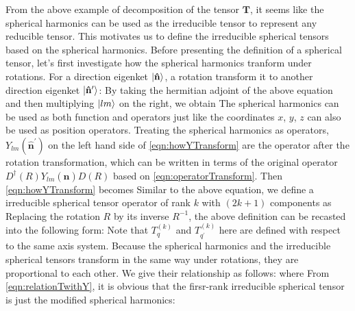 From  the above example of decomposition of the tensor $\mathbf{T}$, it seems like the spherical harmonics can be 
used as the irreducible tensor to represent any reducible tensor. This motivates us to define the irreducible spherical
tensors based on the spherical harmonics. Before presenting the definition of a spherical tensor, let's first investigate
how the spherical harmonics tranform under rotations. For a direction eigenket $|   \mathbf{\hat{n}}   \rangle$, a rotation 
transform it to another direction eigenket $|   \mathbf{\hat{n }^{\prime} }   \rangle$:
By taking the hermitian adjoint of the above equation and then multiplying $| l m \rangle$ on the right, we obtain
The spherical harmonics can be used as both function and operators just like the coordinates $x$, $y$, $z$ can also 
be used as position operators. Treating the spherical harmonics as operators, $Y_{lm}(\mathbf{\hat{n}^{\prime} })$ on
 the left hand side of \autoref{eqn:howYTransform} are the operator after the rotation transformation, which can be written in terms of  
the original operator $D^{\dagger}(R) Y_{lm}(\mathbf{\hat{n} }) D(R)$ based on \autoref{eqn:operatorTransform}. 
Then \autoref{eqn:howYTransform} becomes
Similar to the above equation, we define a irreducible spherical tensor operator of rank $k$ with $(2 k + 1)$ components as
Replacing the rotation $R$ by its inverse $R^{-1}$, the above definition can be recasted into the following form:
Note that $T_{q}^{(k)} $ and $T_{q^{\prime}}^{(k)}$ here are defined with respect to the same 
axis system. Because the spherical harmonics and the irreducible spherical tensors transform in the same way under 
rotations, they are proportional to each other. We give their relationship as follows:
where 
From \autoref{eqn:relationTwithY}, it is obvious that the firsr-rank irreducible spherical tensor is just the modified 
spherical harmonics:


